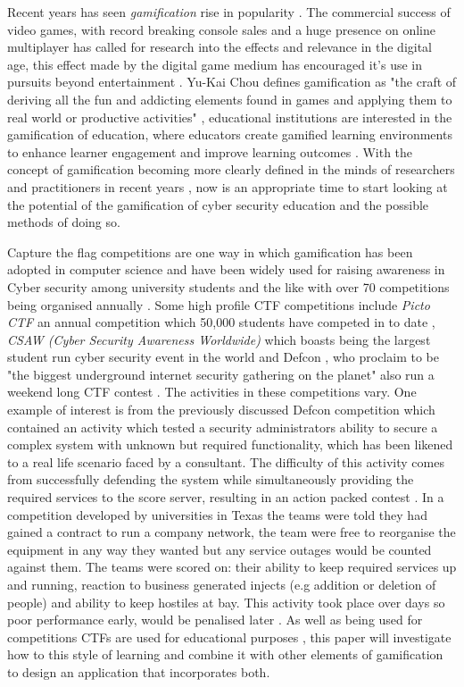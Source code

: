 \documentclass[12pt,a4paper]{article}
\begin{document}
Recent years has seen \emph{gamification} rise in popularity \cite{deterding2011game}. The commercial success of video games, with record breaking console sales and a huge presence on online multiplayer has called for research into the effects and relevance in the digital age, this effect made by the digital game medium has encouraged it's use in pursuits beyond entertainment \cite{seaborn2015gamification}. Yu-Kai Chou defines gamification as "the craft of deriving all the fun and addicting elements found in games and applying them to real world or productive activities" \cite{huang2013gamification}, educational institutions are interested in the gamification of education, where educators create gamified learning environments to enhance learner engagement and improve learning outcomes \cite{nah2014gamification}. With the concept of gamification becoming more clearly defined in the minds of researchers and practitioners in recent years \cite{caponetto2014gamification}, now is an appropriate time to start looking at the potential of the gamification of cyber security education and the possible methods of doing so.

Capture the flag competitions are one way in which gamification has been adopted in computer science and have been widely used for raising awareness in Cyber security among university students and the like \cite{ford2017capture} with over 70 competitions being organised annually \cite{katsantonis2017conceptual1}. Some high profile CTF competitions include \emph{Picto CTF} \cite{pictoctf} an annual competition which 50,000 students have competed in to date \cite{pictoctfstat}, \emph{CSAW (Cyber Security Awareness Worldwide)} which boasts being the largest student run cyber security event in the world \cite{csaw} and Defcon \cite{defcon}, who proclaim to be "the biggest underground internet security gathering on the planet" also run a weekend long CTF contest \cite{cowan2003defcon}. The activities in these competitions vary. One example of interest is from the previously discussed Defcon competition which contained an activity which tested a security administrators ability to secure a complex system with unknown but required functionality, which has been likened to a real life scenario faced by a consultant. The difficulty of this activity comes from successfully defending the system while simultaneously providing the required services to the score server, resulting in an action packed contest \cite{cowan2003defcon}. In a competition developed by universities in Texas the teams were told they had gained a contract to run a company network, the team were free to reorganise the equipment in any way they wanted but any service outages would be counted against them. The teams were scored on: their ability to keep  required services up and running, reaction to business generated injects (e.g addition or deletion of people) and ability to keep hostiles at bay. This activity took place over days so poor performance early, would be penalised later \cite{conklin2006cyber}. As well as being used for competitions CTFs are used for educational purposes \cite{noor2018usability}, this paper will investigate how to this style of learning and combine it with other elements of gamification to design an application that incorporates both.
\end{document}
